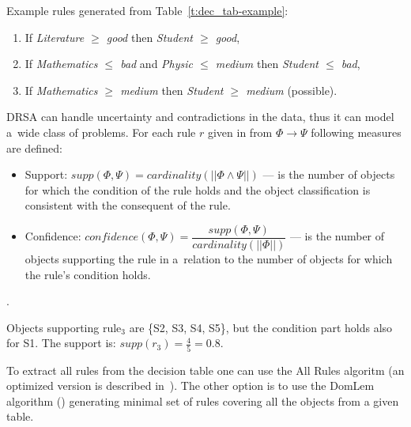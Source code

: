 Example rules generated from Table~\ref{t:dec_tab-example}:
\begin{enumerate}
\item If \textit{Literature $\ge$ good} then \textit{Student $\ge$ good},
\item If \textit{Mathematics $\le$ bad} and \textit{Physic $\le$ medium} then
  \textit{Student $\le$ bad},
\item If \textit{Mathematics $\ge$ medium} then \textit{Student $\ge$ medium}
  (possible).
\end{enumerate}

DRSA can handle uncertainty and contradictions in the data, thus it can model
a~wide class of problems. For each rule $r$ given in from $\Phi \to \Psi$
following measures are defined:
\begin{itemize}
\item Support: $\textit{supp}(\Phi, \Psi) = \textit{cardinality}(||\Phi \land
  \Psi||)$ --- is the number of objects for which the condition of the rule
  holds and the object classification is consistent with the consequent of the
  rule.
\item Confidence: $\textit{confidence}(\Phi, \Psi) =
  \dfrac{\textit{supp}(\Phi, \Psi)}{\textit{cardinality}(||\Phi||)}$ --- is
  the number of objects supporting the rule in a~relation to the number of
  objects for which the rule's condition holds.
\end{itemize}.

Objects supporting rule$_3$ are \{S2, S3, S4, S5\}, but the condition part
holds also for S1. The support is: $\textit{supp}(r_3) = \frac{4}{5} = 0.8$.

To extract all rules from the decision table one can use the All Rules
algoritm (an optimized version is described in~\cite{Zur01}). The other option
is to use the DomLem algorithm (\cite{GMS+01}) generating minimal set of rules
covering all the objects from a given table.


